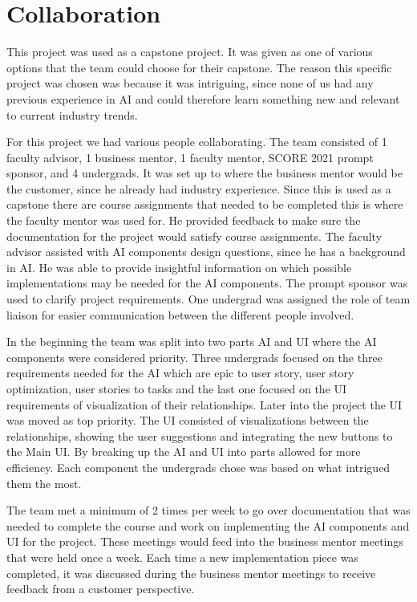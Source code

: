 \section{Collaboration}
This project was used as a capstone project. It was given as one of various options that the team could choose for their capstone. The reason this specific project was chosen was because it was intriguing, since none of us had any previous experience in AI and could therefore learn something new and relevant to current industry trends.

For this project we had various people collaborating. The team consisted of 1 faculty advisor, 1 business mentor, 1 faculty mentor, SCORE 2021 prompt sponsor, and 4 undergrads. It was set up to where the business mentor would be the customer, since he already had industry experience. Since this is used as a capstone there are course assignments that needed to be completed this is where the faculty mentor was used for. He provided feedback to make sure the documentation for the project would satisfy course assignments. The faculty advisor assisted with AI components design questions, since he has a background in AI. He was able to provide insightful information on which possible implementations may be needed for the AI components. The prompt sponsor was used to clarify project requirements. One undergrad was assigned the role of team liaison for easier communication between the different people involved.

In the beginning the team was split into two parts AI and UI where the AI components were considered priority. Three undergrads focused on the three requirements needed for the AI which are epic to user story, user story optimization, user stories to tasks and the last one focused on the UI requirements of visualization of their relationships. Later into the project the UI was moved as top priority. The UI consisted of visualizations between the relationships, showing the user suggestions and integrating the new buttons to the Main UI. By breaking up the AI and UI into parts allowed for more efficiency. Each component the undergrads chose was based on what intrigued them the most.

The team met a minimum of 2 times per week to go over documentation that was needed to complete the course and work on implementing the AI components and UI for the project. These meetings would feed into the business mentor meetings that were held once a week. Each time a new implementation piece was completed, it was discussed during the business mentor meetings to receive feedback from a customer perspective.

